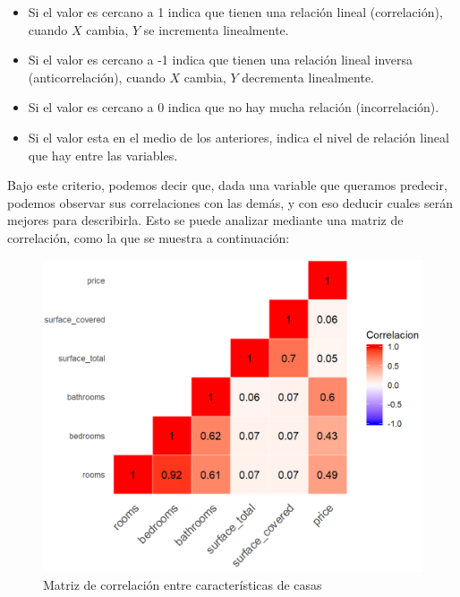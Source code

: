     \begin{itemize}
        \item Si el valor es cercano a 1 indica que tienen una relación lineal (correlación), cuando $X$ cambia, $Y$ se incrementa linealmente.
        
        \item Si el valor es cercano a -1 indica que tienen una relación lineal inversa (anticorrelación), cuando $X$ cambia, $Y$ decrementa linealmente.
        
        \item Si el valor es cercano a 0 indica que no hay mucha relación (incorrelación).
        
        \item Si el valor esta en el medio de los anteriores, indica el nivel de relación lineal que hay entre las variables.
    \end{itemize}
    
    Bajo este criterio, podemos decir que, dada una variable que queramos predecir, podemos observar sus correlaciones con las demás, y con eso deducir cuales serán mejores para describirla. Esto se puede analizar mediante una matriz de correlación, como la que se muestra a continuación:
    
    \begin{figure}[H]
        \begin{center}
            \includegraphics[scale=0.6]{img/explicaciones/Corr-Matrix-Heatmap.png}
            \caption{Matriz de correlación entre características de casas}
            \end{center}
    \end{figure}
    
